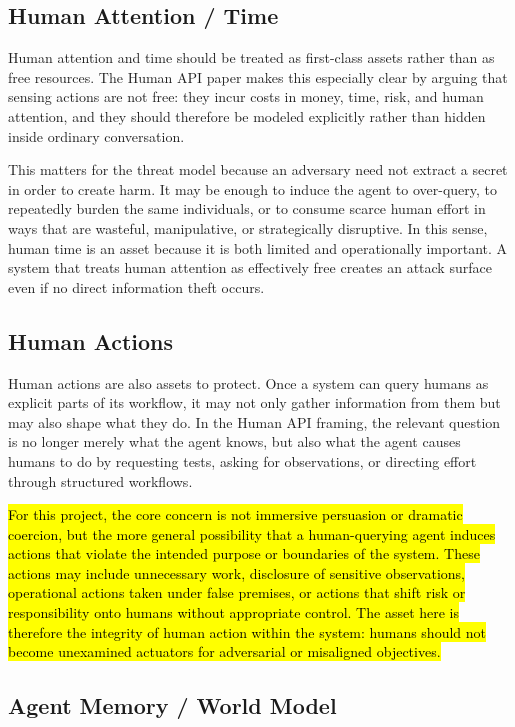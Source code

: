 \documentclass[11pt]{article}
\begin{document}
\subsection{Human Attention / Time}

Human attention and time should be treated as first-class assets rather than as free resources. The Human API paper makes this especially clear by arguing that sensing actions are not free: they incur costs in money, time, risk, and human attention, and they should therefore be modeled explicitly rather than hidden inside ordinary conversation. \citep{oliver2026humanapi}

This matters for the threat model because an adversary need not extract a secret in order to create harm. It may be enough to induce the agent to over-query, to repeatedly burden the same individuals, or to consume scarce human effort in ways that are wasteful, manipulative, or strategically disruptive. In this sense, human time is an asset because it is both limited and operationally important. A system that treats human attention as effectively free creates an attack surface even if no direct information theft occurs.

\subsection{Human Actions}

Human actions are also assets to protect. Once a system can query humans as explicit parts of its workflow, it may not only gather information from them but may also shape what they do. In the Human API framing, the relevant question is no longer merely what the agent knows, but also what the agent causes humans to do by requesting tests, asking for observations, or directing effort through structured workflows. \citep{oliver2026humanapi}

\hl{For this project, the core concern is not immersive persuasion or dramatic coercion, but the more general possibility that a human-querying agent induces actions that violate the intended purpose or boundaries of the system. These actions may include unnecessary work, disclosure of sensitive observations, operational actions taken under false premises, or actions that shift risk or responsibility onto humans without appropriate control. The asset here is therefore the integrity of human action within the system: humans should not become unexamined actuators for adversarial or misaligned objectives.}


\subsection{Agent Memory / World Model}
\end{document}
